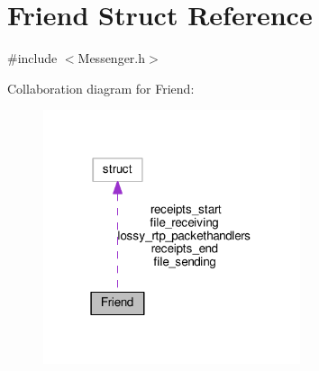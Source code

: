 \hypertarget{struct_friend}{\section{Friend Struct Reference}
\label{struct_friend}
}


{\ttfamily \#include $<$Messenger.\+h$>$}



Collaboration diagram for Friend\+:
\nopagebreak
\begin{figure}[H]
\begin{center}
\leavevmode
\includegraphics[width=214pt]{db/d78/struct_friend__coll__graph}
\end{center}
\end{figure}
